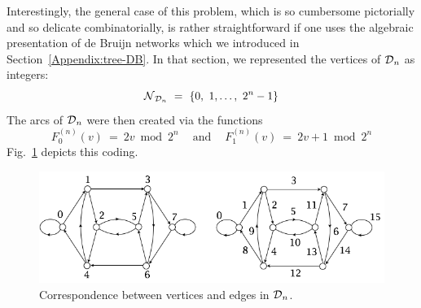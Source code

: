 \begin{itemize}
\medskip

Interestingly, the general case of this problem, which is so cumbersome pictorially and so delicate combinatorially, is rather straightforward if one uses the algebraic presentation of de Bruijn networks which we introduced in Section~\ref{Appendix:tree-DB}.  In that section, we represented the vertices of $\mbox{$\cal D$}_n$ as integers:
\[ \mbox{$\cal N$}_{{\cal D}_n} \ = \ \{ 0, \ 1, \ldots, \ 2^n -1 \} \]
The arcs of $\mbox{$\cal D$}_n$ were then created via the functions
\[ F^{(n)}_0(v) \ = \ 2v \bmod 2^n \ \ \ \ \mbox{ and } \ \ \ \ F^{(n)}_1(v) \ = \ 2v +1 \bmod 2^n \]
Fig.~\ref{fig:deBruijn3coding} depicts this coding. 
\begin{figure}[h]
\begin{center}
        \includegraphics[scale=0.4]{FiguresGraph/deBruijn3coding}
        \caption{Correspondence between vertices and edges in $\mbox{$\cal D$}_n$.}
        \label{fig:deBruijn3coding}
\end{center}
\end{figure}
\smallskip


\end{itemize}
